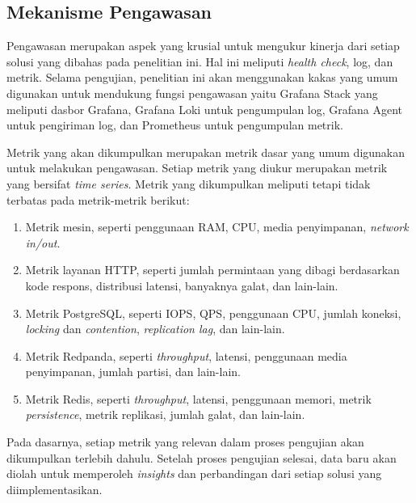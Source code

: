 \subsection{Mekanisme Pengawasan}

Pengawasan merupakan aspek yang krusial untuk mengukur kinerja dari setiap solusi yang dibahas pada penelitian ini. Hal ini meliputi \textit{health check}, log, dan metrik. Selama pengujian, penelitian ini akan menggunakan kakas yang umum digunakan untuk mendukung fungsi pengawasan yaitu Grafana Stack yang meliputi dasbor Grafana, Grafana Loki untuk pengumpulan log, Grafana Agent untuk pengiriman log, dan Prometheus untuk pengumpulan metrik.

Metrik yang akan dikumpulkan merupakan metrik dasar yang umum digunakan untuk melakukan pengawasan. Setiap metrik yang diukur merupakan metrik yang bersifat \textit{time series}. Metrik yang dikumpulkan meliputi tetapi tidak terbatas pada metrik-metrik berikut:

\begin{enumerate}
    \item Metrik mesin, seperti penggunaan RAM, CPU, media penyimpanan, \textit{network in/out}.
    \item Metrik layanan HTTP, seperti jumlah permintaan yang dibagi berdasarkan kode respons, distribusi latensi, banyaknya galat, dan lain-lain.
    \item Metrik PostgreSQL, seperti IOPS, QPS, penggunaan CPU, jumlah koneksi, \textit{locking} dan \textit{contention}, \textit{replication lag}, dan lain-lain.
    \item Metrik Redpanda, seperti \textit{throughput}, latensi, penggunaan media penyimpanan, jumlah partisi, dan lain-lain.
    \item Metrik Redis, seperti \textit{throughput}, latensi, penggunaan memori, metrik \textit{persistence}, metrik replikasi, jumlah galat, dan lain-lain.
\end{enumerate}

Pada dasarnya, setiap metrik yang relevan dalam proses pengujian akan dikumpulkan terlebih dahulu. Setelah proses pengujian selesai, data baru akan diolah untuk memperoleh \textit{insights} dan perbandingan dari setiap solusi yang diimplementasikan.